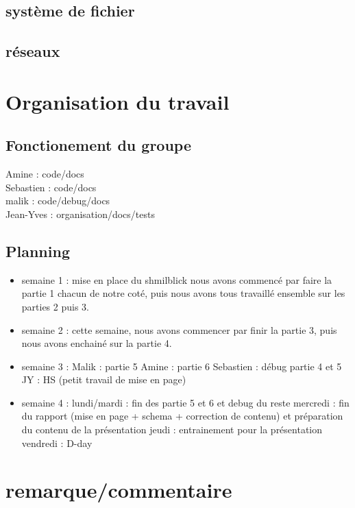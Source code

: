 \documentclass{article}
\begin{document}
	\subsection{système de fichier}

	\subsection{réseaux}

\section{Organisation du travail}
	\subsection{Fonctionement du groupe}
		Amine : code/docs\\
		Sebastien : code/docs\\
		malik : code/debug/docs\\
		Jean-Yves : organisation/docs/tests\\

	\subsection{Planning}
	\begin{itemize}
		\item semaine 1 :
			\subitem mise en place du shmilblick
			\subitem nous avons commencé par faire la partie 1 chacun de notre coté,
			\subitem puis nous avons tous travaillé ensemble sur les parties 2 puis 3.

		\item semaine 2 :
			\subitem cette semaine, nous avons commencer par finir la partie 3, puis nous avons enchainé sur la partie 4.

		\item semaine 3 :
			\subitem Malik : partie 5
			\subitem Amine : partie 6
			\subitem Sebastien : débug partie 4 et 5
			\subitem JY : HS (petit travail de mise en page)

		\item semaine 4 :
			\subitem lundi/mardi : fin des partie 5 et 6 et debug du reste
			\subitem mercredi : fin du rapport (mise en page + schema + correction de contenu) et préparation du contenu de la présentation
			\subitem jeudi : entrainement pour la présentation
			\subitem vendredi : D-day
	\end{itemize}

\section{remarque/commentaire}
\end{document}
